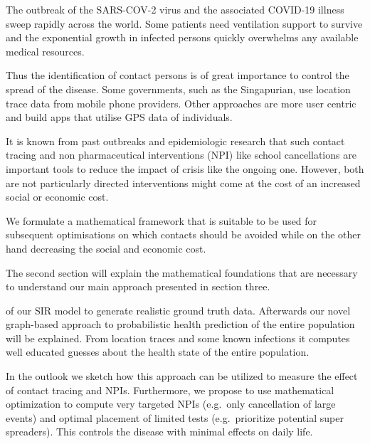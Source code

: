 The outbreak of the SARS-COV-2 virus and the associated COVID-19 illness sweep rapidly across the world. Some patients need ventilation support to survive and the exponential growth in infected persons quickly overwhelms any available medical resources.

Thus the identification of contact persons is of great importance to control the spread of the disease. Some governments, such as the Singapurian, use location trace data from mobile phone providers. Other approaches are more user centric and build apps that utilise GPS data of individuals.

It is known from past outbreaks and epidemiologic research that such contact tracing and non pharmaceutical interventions (NPI) like school cancellations are important tools to reduce the impact of crisis like the ongoing one. However, both are not particularly directed interventions might come at the cost of an increased social or economic cost.

We formulate a mathematical framework that is suitable to be used for subsequent optimisations on which contacts should be avoided while on the other hand decreasing the social and economic cost.

The second section will explain the mathematical foundations that are necessary to understand our main approach presented in section three.


of our SIR model to generate realistic ground truth data.
Afterwards our novel graph-based approach to probabilistic health prediction of the entire population will be explained.
From location traces and some known infections it computes well educated guesses about the health state of the entire population.

In the outlook we sketch how this approach can be utilized to measure the effect of contact tracing and NPIs.
Furthermore, we propose to use mathematical optimization to compute very targeted NPIs (e.g.\ only cancellation of large events) and optimal placement of limited tests (e.g.\ prioritize potential super spreaders).
This controls the disease with minimal effects on daily life.